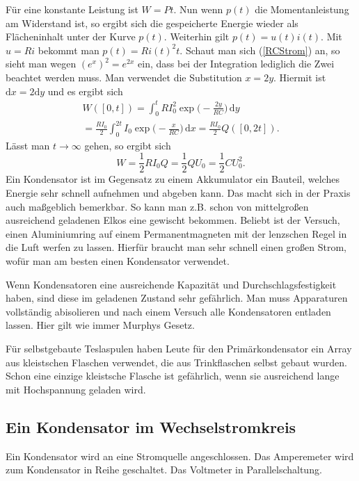 \documentclass[a4paper,10pt,fleqn,twocolumn,twoside,dvipdfmx]{scrartcl}
\numberwithin{equation}{section}
\begin{document}
Für eine konstante Leistung ist $W=Pt$. Nun wenn $p(t)$ die
Momentanleistung am Widerstand ist, so ergibt sich die gespeicherte
Energie wieder als Flächeninhalt unter der Kurve $p(t)$.
Weiterhin gilt $p(t)=u(t)i(t)$. Mit $u=Ri$ bekommt man
$p(t)=Ri(t)^2 t$. Schaut man sich (\ref{RCStrom}) an, so sieht man
wegen $(e^x)^2=e^{2x}$ ein, dass bei der Integration lediglich
die Zwei beachtet werden muss. Man verwendet die Substitution
$x=2y$. Hiermit ist $\mathrm dx=2\mathrm dy$ und es ergibt sich%
\begin{gather*}
W([0,t]) = \int_0^t RI_0^2 \exp\Big(-\frac{2y}{RC}\Big)\,\mathrm dy\\
= \frac{RI_0}{2}\int_0^{2t} I_0 \exp\Big(-\frac{x}{RC}\Big)\,\mathrm dx
= \frac{RI_0}{2}Q([0,2t]).
\end{gather*}
Lässt man $t\rightarrow\infty$ gehen, so ergibt sich%
\begin{equation}
W = \frac{1}{2}RI_0Q = \frac{1}{2}QU_0 = \frac{1}{2}CU_0^2.
\end{equation}
Ein Kondensator ist im Gegensatz zu einem Akkumulator ein Bauteil,
welches Energie sehr schnell aufnehmen und abgeben kann. Das macht
sich in der Praxis auch maßgeblich bemerkbar. So kann man z.B. schon
von mittelgroßen ausreichend geladenen Elkos eine gewischt bekommen.
Beliebt ist der Versuch, einen Aluminiumring auf einem
Permanentmagneten mit der lenzschen Regel in die Luft werfen zu
lassen. Hierfür braucht man sehr schnell einen großen Strom, wofür
man am besten einen Kondensator verwendet.

Wenn Kondensatoren eine ausreichende Kapazität und
Durchschlagsfestigkeit haben, sind diese im geladenen Zustand
sehr gefährlich. Man muss Apparaturen vollständig abisolieren
und nach einem Versuch alle Kondensatoren entladen lassen.
Hier gilt wie immer Murphys Gesetz.

Für selbstgebaute Teslaspulen haben Leute für den Primärkondensator
ein Array aus kleistschen Flaschen verwendet, die aus Trinkflaschen
selbst gebaut wurden. Schon eine einzige kleistsche Flasche ist
gefährlich, wenn sie ausreichend lange mit Hochspannung geladen wird.


\subsection[Ein Kondensator im Wechselstromkreis]%
{Ein Kondensator im Wechselstromkreis}

Ein Kondensator wird an eine Stromquelle angeschlossen.
Das Amperemeter wird zum Kondensator in Reihe geschaltet.
Das Voltmeter in Parallelschaltung.
\end{document}
